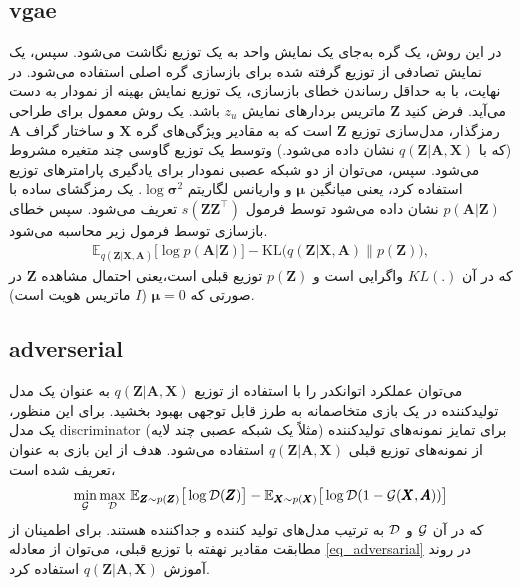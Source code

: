 \subsection{\gls{vgae}}
در این روش، یک گره به‌جای یک نمایش واحد به یک توزیع نگاشت می‌شود. سپس، یک نمایش تصادفی از توزیع گرفته شده برای بازسازی گره اصلی استفاده می‌شود. در نهایت، با به حداقل رساندن خطای بازسازی، یک توزیع نمایش بهینه از نمودار به دست می‌آید.
فرض کنید $\pmb{Z}$ ماتریس بردارهای نمایش $ z_u $ باشد. یک روش معمول برای طراحی رمزگذار، مدل‌سازی توزیع $\pmb{Z}$ است که به مقادیر ویژگی‌های گره $\pmb{X}$ و ساختار گراف $\pmb{A}$ (که با $q(\pmb{Z}\vert \pmb{A},\pmb{X})$ نشان داده می‌شود.) وتوسط یک توزیع گاوسی چند متغیره مشروط می‌شود. سپس، می‌توان از دو شبکه عصبی نمودار برای یادگیری پارامترهای توزیع استفاده کرد، یعنی میانگین $\pmb{\mu}$ و واریانس لگاریتم $\log{\pmb{\sigma}^2}$. 
یک رمزگشای ساده با $p(\pmb{A}\vert \pmb{Z})$ نشان داده می‌شود توسط فرمول
$s(\pmb{ZZ}^{\intercal})$
تعریف می‌شود. 
سپس خطای باز‌سازی توسط فرمول زیر محاسبه می‌شود.
\begin{gather}
\mathbb{E}_{q(\pmb{Z}\vert \pmb{X},\pmb{A})}\big[\log{p(\pmb{A}\vert \pmb{Z})}\big]
-
\text{KL}\big(q(\pmb{Z}\vert \pmb{X},\pmb{A}) \parallel p(\pmb{Z})\big),
\label{train_reconstruct}
\end{gather}
که در آن $KL(.)$ واگرایی  است و $p(\pmb{Z})$ توزیع قبلی است،یعنی احتمال مشاهده  $\pmb{Z}$ در صورتی که $\pmb{\mu}=0$ ($ I $ ماتریس هویت است).

\subsection{\gls{adverserial}}
می‌توان عملکرد اتوانکدر را با استفاده از توزیع $q(\pmb{Z}\vert \pmb{A},\pmb{X})$ به عنوان یک مدل تولیدکننده در یک بازی متخاصمانه به طرز قابل توجهی بهبود بخشید. برای این منظور، یک مدل \gls{discriminator} (مثلاً یک شبکه عصبی چند لایه) برای تمایز نمونه‌های تولید‌کننده از نمونه‌های توزیع قبلی $q(\pmb{Z}\vert \pmb{A},\pmb{X})$ استفاده می‌شود. هدف از این بازی به عنوان تعریف شده است، 
\begin{equation}
\min\limits_{\mathcal{G}}
\max\limits_{\mathcal{D}} 
\,\mathbb{E}_{\pmb{Z}\sim p(\pmb{Z})}\big[\log{\mathcal{D}(\pmb{Z})}\big]
-
\mathbb{E}_{\pmb{X}\sim p(\pmb{X})}\big[\log{\mathcal{D}(1-\mathcal{G}(\pmb{X},\pmb{A}))}\big]
\label{eq_adversarial}
\end{equation}
که در آن $\mathcal{G}$ و $\mathcal{D}$ به ترتیب مدل‌های تولید کننده و جداکننده هستند. برای اطمینان از مطابقت مقادیر نهفته با توزیع قبلی، می‌توان از معادله 
\eqref {eq_adversarial} 
در روند آموزش $q(\pmb{Z}\vert \pmb{A},\pmb{X})$ استفاده کرد.


